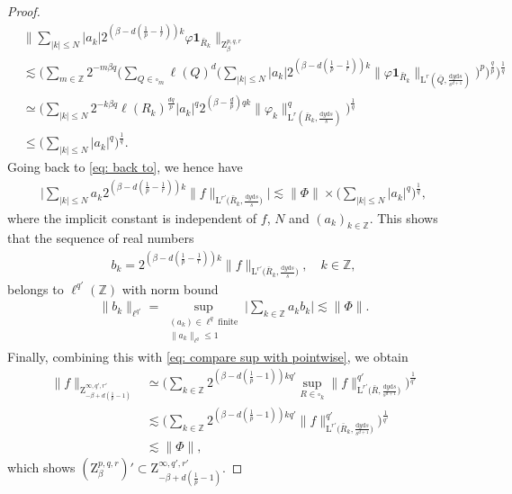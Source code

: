 \documentclass[11pt, leqno,parskip=half]{amsart}
\theoremstyle{definition}
\newcommand{\IZ}{\mathbb{Z}}
\renewcommand{\L}{\mathrm{L}}
\newcommand{\Z}{\mathrm{Z}}
\newcommand{\ind}{{\mathbf{1}}}
\renewcommand{\d}{\mathrm{d}}
\numberwithin{equation}{section}
\begin{document}
\begin{proof}
\begin{align*}
       &\bigg\|\sum\limits_{|k|\leq N} |a_k|2^{(\beta-d(\frac{1}{p}-\frac{1}{r}))k}\varphi \ind_{\bar R_k} \bigg\|_{\Z^{p,q,r}_\beta} \\
       &\lesssim \Big(\sum\limits_{m\in\IZ} 2^{-m\beta q} \Big(\sum\limits_{Q\in\square_m} \ell(Q)^d \Big( \sum\limits_{|k|\leq N} |a_k|2^{(\beta-d(\frac{1}{p}-\frac{1}{r}))k} \|\varphi \ind_{\bar R_k} \|_{\L^r(\bar Q,\frac{\d y \d s}{s^{d+1}})} \Big)^p \Big)^\frac{q}{p} \Big)^\frac{1}{q}\\
       &\simeq \Big(\sum\limits_{|k|\leq N} 2^{-k\beta q} \ell(R_k)^\frac{dq}{p}  |a_k|^q2^{(\beta-\frac{d}{p})qk} \|\varphi_k\|^q_{\L^r(\bar R_k,\frac{\d y \d s}{s})}  \Big)^\frac{1}{q}\\
       &\leq \Big(\sum\limits_{|k|\leq N}  |a_k|^q \Big)^\frac{1}{q}.
    \end{align*}
    Going back to \eqref{eq: back to}, we hence have
    \begin{align*}
        \Big|\sum\limits_{|k|\leq N} a_k2^{(\beta-d(\frac{1}{p}-\frac{1}{r}))k}  \|f\|_{\L^{r'}\big(\bar R_k,\frac{\d y \d s}{s}\big)}\Big|\lesssim \|\Phi\|\times \Big(\sum\limits_{|k|\leq N}  |a_k|^q \Big)^\frac{1}{q},
    \end{align*}
    where the implicit constant is independent of $f$, $N$ and $(a_k)_{k\in\IZ}$. This shows that the sequence of real numbers
    \begin{align*}
        b_k = 2^{(\beta-d(\frac{1}{p}-\frac{1}{r}))k}  \|f\|_{\L^{r'}\big(\bar R_k,\frac{\d y \d s}{s}\big)}, \quad k\in\IZ,
    \end{align*}
    belongs to $\ell^{q'}(\IZ)$ with norm bound
    \begin{align*}
        \|b_k\|_{\ell^{q'}} = \sup\limits_{\substack{(a_k)\in \ell^{q}\ \text{finite}\\
        \|a_k\|_{\ell^q}\leq 1}}\Big|\sum\limits_{k\in\IZ} a_k b_k\Big|\lesssim \|\Phi\|.
    \end{align*}
    Finally, combining this with \eqref{eq: compare sup with pointwise}, we obtain
    \begin{align*}
        \|f\|_{\Z^{\infty,q',r'}_{-\beta+d(\frac{1}{p}-1)}} &\simeq\Big(\sum\limits_{k\in\IZ} 2^{(\beta-d(\frac{1}{p}-1))kq'}  \sup\limits_{R\in\square_k}\|f\|^{q'}_{\L^{r'}\big(\bar R,\frac{\d y \d s}{s^{d+1}}\big)}\Big)^\frac{1}{q'}\\
        &\lesssim\Big(\sum\limits_{k\in\IZ} 2^{(\beta-d(\frac{1}{p}-1))kq'}  \|f\|^{q'}_{\L^{r'}\big(\bar R_k,\frac{\d y \d s}{s^{d+1}}\big)}\Big)^\frac{1}{q'}\\
        &\lesssim \|\Phi\|,
    \end{align*}
    which shows $(\Z^{p,q,r}_\beta)'\subset  \Z^{\infty,q',r'}_{-\beta+d(\frac{1}{p}-1)}$.
\end{proof}
\end{document}
